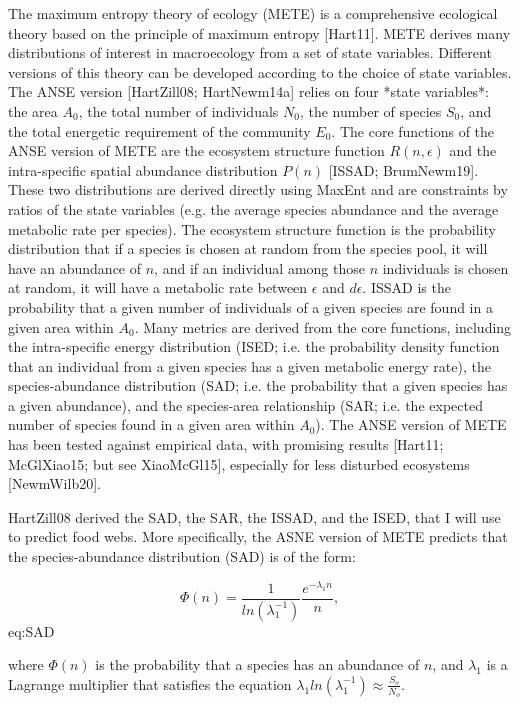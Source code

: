 The maximum entropy theory of ecology (METE) is a comprehensive ecological
theory based on the principle of maximum entropy [Hart11]. METE derives many
distributions of interest in macroecology from a set of state variables.
Different versions of this theory can be developed according to the choice of
state variables. The ANSE version [HartZill08; HartNewm14a] relies on four
*state variables*: the area $A_0$, the total number of individuals $N_0$, the
number of species $S_0$, and the total energetic requirement of the community
$E_0$. The core functions of the ANSE version of METE are the ecosystem
structure function $R(n, \epsilon)$ and the intra-specific spatial abundance
distribution $P(n)$ [ISSAD; BrumNewm19]. These two distributions are derived
directly using MaxEnt and are constraints by ratios of the state variables (e.g.
the average species abundance and the average metabolic rate per species). The
ecosystem structure function is the probability distribution that if a species
is chosen at random from the species pool, it will have an abundance of $n$, and
if an individual among those $n$ individuals is chosen at random, it will have a
metabolic rate between $\epsilon$ and $d\epsilon$. ISSAD is the probability that
a given number of individuals of a given species are found in a given area
within $A_0$. Many metrics are derived from the core functions, including the
intra-specific energy distribution (ISED; i.e. the probability density function
that an individual from a given species has a given metabolic energy rate), the
species-abundance distribution (SAD; i.e. the probability that a given species
has a given abundance), and the species-area relationship (SAR; i.e. the
expected number of species found in a given area within $A_0$). The ANSE version
of METE has been tested against empirical data, with promising results [Hart11;
McGlXiao15; but see XiaoMcGl15], especially for less disturbed ecosystems
[NewmWilb20].

HartZill08 derived the SAD, the SAR, the ISSAD, and the ISED, that I will use
to predict food webs. More specifically, the ASNE version of METE predicts that
the species-abundance distribution (SAD) is of the form:

$$\Phi(n) = \frac{1}{ln(\lambda_1^{-1})}\frac{e^{-\lambda_1n}}{n},$${eq:SAD}

where $\Phi(n)$ is the probability that a species has an abundance of $n$, and
$\lambda_1$ is a Lagrange multiplier that satisfies the equation
$\lambda_1ln(\lambda_1^{-1}) \approx \frac{S_o}{N_o}$.

